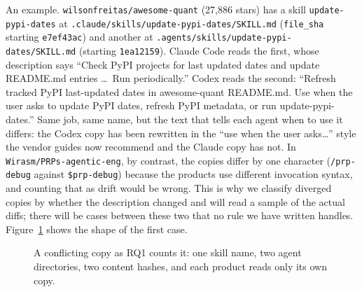 \documentclass[11pt]{article}
\begin{document}
An example. \texttt{wilsonfreitas/awesome-quant} (27{,}886 stars) has a skill \texttt{update-pypi-dates} at
\texttt{.claude/skills/update-pypi-dates/SKILL.md} (\texttt{file\_sha} starting \texttt{e7ef43ac}) and another at
\texttt{.agents/skills/update-pypi-dates/SKILL.md} (starting \texttt{1ea12159}). Claude Code reads the first, whose
description says ``Check PyPI projects for last updated dates and update README.md entries \ldots\ Run periodically.'' Codex
reads the second: ``Refresh tracked PyPI last-updated dates in awesome-quant README.md. Use when the user asks to update PyPI
dates, refresh PyPI metadata, or run update-pypi-dates.'' Same job, same name, but the text that tells each agent when to use
it differs: the Codex copy has been rewritten in the ``use when the user asks\ldots'' style the vendor guides now recommend
and the Claude copy has not. In \texttt{Wirasm/PRPs-agentic-eng}, by contrast, the copies differ by one character
(\texttt{/prp-debug} against \texttt{\$prp-debug}) because the products use different invocation syntax, and counting that
as drift would be wrong. This is why we classify diverged copies by whether the description changed and will read a sample
of the actual diffs; there will be cases between these two that no rule we have written handles. Figure~\ref{fig:drift}
shows the shape of the first case.

\begin{figure}[h]
\centering
{}
\caption{A conflicting copy as RQ1 counts it: one skill name, two agent directories, two content hashes, and each product reads only its own copy.}
\label{fig:drift}
\end{figure}
\end{document}
